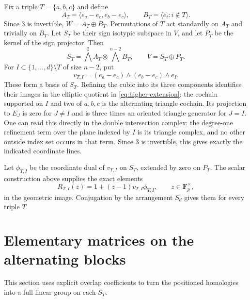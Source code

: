 Fix a triple $T=\{a,b,c\}$ and define
\[
A_T=\langle e_a-e_c,e_b-e_c\rangle,
\qquad B_T=\langle e_i:i\notin T\rangle.
\]
Since $3$ is invertible, $W=A_T\oplus B_T$. Permutations of $T$ act standardly on $A_T$ and trivially on $B_T$. Let $S_T$ be their sign isotypic subspace in $V$, and let $P_T$ be the kernel of the sign projector. Then
\begin{equation}\label{eq:higher-block}
S_T=\bigwedge^2A_T\otimes\bigwedge^{n-2}B_T,
\qquad V=S_T\oplus P_T.
\end{equation}
For $I\subset\{1,\ldots,d\}\setminus T$ of size $n-2$, put
\[
v_{T,I}=(e_a-e_c)\wedge(e_b-e_c)\wedge e_I.
\]
These form a basis of $S_T$. Refining the cubic into its three components identifies their images in the elliptic quotient in \eqref{eq:higher-extension}: the cochain supported on $I$ and two of $a,b,c$ is the alternating triangle cochain. Its projection to $E_J$ is zero for $J\ne I$ and is three times an oriented triangle generator for $J=I$. One can read this directly in the double intersection complex: the degree-one refinement term over the plane indexed by $I$ is its triangle complex, and no other outside index set occurs in that term. Since $3$ is invertible, this gives exactly the indicated coordinate lines.

Let $\phi_{T,I}$ be the coordinate dual of $v_{T,I}$ on $S_T$, extended by zero on $P_T$. The scalar construction above supplies the exact elements
\begin{equation}\label{eq:higher-homology}
R_{T,I}(z)=1+(z-1)v_{T,I}\phi_{T,I},
\qquad z\in\mathbf F_p^\times,
\end{equation}
in the geometric image. Conjugation by the arrangement $S_d$ gives them for every triple $T$.

\section{Elementary matrices on the alternating blocks}\label{sec:higher-block-generation}
This section uses explicit overlap coefficients to turn the positioned homologies into a full linear group on each $S_T$.


